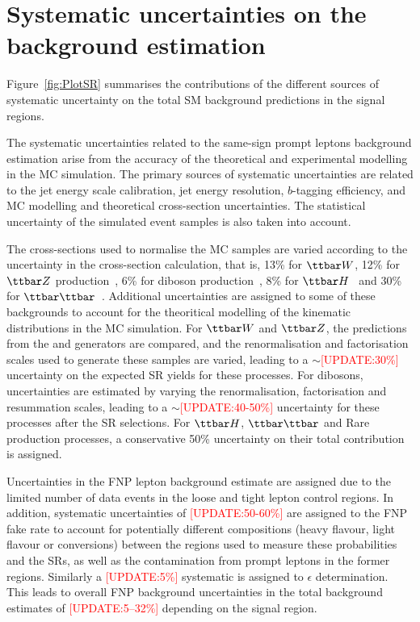 \section{Systematic uncertainties on the background estimation}
\label{sec:syst}

Figure~\ref{fig:PlotSR} summarises the contributions of the different sources of systematic uncertainty 
on the total SM background predictions in the signal regions.

The systematic uncertainties related to the same-sign prompt leptons background estimation 
arise from the accuracy of the theoretical and experimental modelling in the MC simulation.
The primary sources of systematic uncertainties are related to the jet energy scale calibration, 
jet energy resolution, $b$-tagging efficiency, and MC modelling and theoretical cross-section uncertainties. 
The statistical uncertainty of the simulated event samples is also taken into account.

The cross-sections used to normalise the MC samples are varied according to the uncertainty in the 
cross-section calculation, that is, 13\% for $\ttbar W$, 12\% for $\ttbar Z$ production~\cite{YR4}, 6\% for diboson
production~\cite{pubnote_mc_multiboson}, 8\% for $\ttbar H$~\cite{YR4} and 30\% for $\ttbar\ttbar$~\cite{Alwall:2014hca}. 
Additional uncertainties are assigned to some of these backgrounds to account for the theoritical modelling of the kinematic 
distributions in the MC simulation. For $\ttbar W$ and $\ttbar Z$, the predictions from the \AMCATNLO and \SHERPA generators are compared, 
and the renormalisation and factorisation scales used to generate these samples are varied, 
leading to a $\sim$\textcolor{red}{[UPDATE:30\%]} uncertainty on the expected SR yields for these processes. 
For dibosons, uncertainties are estimated by varying the renormalisation, factorisation and resummation scales, 
leading to a $\sim$\textcolor{red}{[UPDATE:40-50\%]} uncertainty for these processes after the SR selections. 
For $\ttbar H$, $\ttbar \ttbar$ and Rare production processes, a conservative 50\% uncertainty 
on their total contribution is assigned. 

Uncertainties in the FNP lepton background estimate are assigned due to the limited number 
of data events in the loose and tight lepton control regions.
In addition, systematic uncertainties of \textcolor{red}{[UPDATE:50-60\%]} are assigned to the FNP fake rate to account 
for potentially different 
compositions (heavy flavour, light flavour or conversions) between the regions used to measure these probabilities and the SRs, 
as well as the contamination from prompt leptons in the former regions. Similarly a \textcolor{red}{[UPDATE:5\%]} systematic is assigned to 
$\epsilon$ determination. This leads to overall FNP background uncertainties in the total background estimates 
of \textcolor{red}{[UPDATE:5--32\%]} depending on the signal region.

